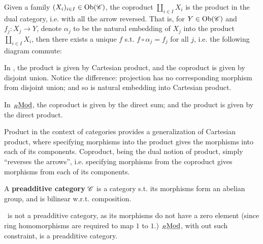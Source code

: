 \documentclass{article}
\begin{document}
\begin{definition}[Coproduct]
    Given a family $(X_i)_{i\in I} \in \mathrm{Ob}(\mathscr{C})$, the coproduct $\amalg_{i\in I} X_i$ is the product in the dual category, i.e. with all the arrow reversed. That is, for $Y \in \mathrm{Ob}(\mathscr{C})$ and $f_j: X_j \to Y$, denote $\alpha_j$ to be the natural embedding of $X_j$ into the product $\amalg_{i\in I} X_i$, then there exists a unique $f$ s.t. $f \circ \alpha_j = f_j$ for all $j$, i.e. the following diagram commute:
    \begin{figure}[htbp]
        \centering
    \end{figure}
\end{definition}

\begin{remark}
    In \catsets, the product is given by Cartesian product, and the coproduct is given by disjoint union. Notice the difference: projection has no corresponding morphism from disjoint union; and so is natural embedding into Cartesian product.

    In ${}_{R}\underline{\textup{Mod}}$, the coproduct is given by the direct sum; and the product is given by the direct product. 
\end{remark}

\begin{remark}
    Product in the context of categories provides a generalization of Cartesian product, where specifying morphisms into the product gives the morphisms into each of its components. Coproduct, being the dual notion of product, simply ``reverses the arrows'', i.e. specifying morphisms from the coproduct gives morphisms from each of its components.
\end{remark}

\begin{definition}
    A \textbf{preadditive category} $\mathscr{C}$ is a category s.t. its morphisms form an abelian group, and is bilinear w.r.t. composition. 
\end{definition}

\begin{remark}
    \catrings\ is not a preadditive category, as its morphisms do not have a zero element (since ring homomorphisms are required to map $1$ to $1$.) ${}_{R}\underline{\textup{Mod}}$, with out such constraint, is a preadditive category.
\end{remark}
\end{document}
